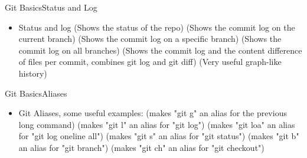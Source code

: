 \begin{frame}{Git Basics}{Status and Log}
\begin{itemize}
\item Status and log
 (Shows the status of the repo)
 (Shows the commit log on the current branch)
 (Shows the commit log on a specific branch)
 (Shows the commit log on all branches)
 (Shows the commit log and the content difference of files per commit, combines 
git log and git diff)
 (Very useful graph-like history)
\end{itemize}
\end{frame}
\begin{frame}{Git Basics}{Aliases}
\begin{itemize}
\item Git Aliases, some useful examples:
 (makes "git g" an alias for the previous long command)
 (makes "git l" an alias for "git log")
 (makes "git loa" an alias
for "git log \dhyphen oneline \dhyphen all")
 (makes "git s" an alias for "git status")
 (makes "git b" an alias for "git branch")
 (makes "git ch" an alias for "git checkout")

\end{itemize}
\end{frame}
